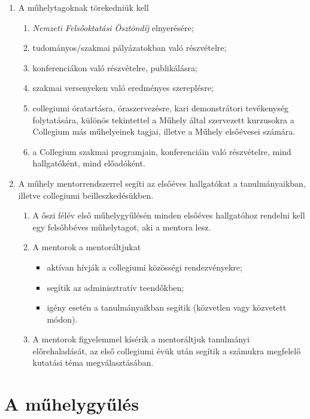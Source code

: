 \documentclass{../styles/rulebook}
\begin{document}
\begin{enumerate}
\begin{enumerate}
	\end{enumerate}
\item A műhelytagoknak törekedniük kell
	\begin{enumerate}
		\item \emph{Nemzeti Felsőoktatási Ösztöndíj} elnyerésére;
		\item tudományos/szakmai pályázatokban való részvételre;
		\item konferenciákon való részvételre, publikálásra;
		\item szakmai versenyeken való eredményes szereplésre;
		\item collegiumi óratartásra, óraszervezésre, kari demonstrátori tevékenység folytatására, különös tekintettel a Műhely által szervezett kurzusokra a Collegium más műhelyeinek tagjai, illetve a Műhely elsőévesei számára.
		\item a Collegium szakmai programjain, konferenciáin való részvételre, mind hallgatóként, mind előadóként.
	\end{enumerate}
\item A műhely mentorrendszerrel segíti az elsőéves hallgatókat a tanulmányaikban, illetve collegiumi beilleszkedésükben.
	\begin{enumerate}
		\item A őszi félév első műhelygyűlésén minden elsőéves hallgatóhoz rendelni kell egy felsőbbéves műhelytagot, aki a mentora lesz.
		\item A mentorok a mentoráltjukat
			\begin{itemize} 
				\item aktívan hívják a collegiumi közösségi rendezvényekre;
				\item segítik az adminisztratív teendőkben;
				\item igény esetén a tanulmányaikban segítik (közvetlen vagy közvetett módon).
			\end{itemize}
		\item A mentorok figyelemmel kísérik a mentoráltjuk tanulmányi előrehaladását, az első collegiumi évük után segítik a számukra megfelelő kutatási téma megválasztásában.
	\end{enumerate}
\end{enumerate}

\section{A műhelygyűlés}
\end{document}
